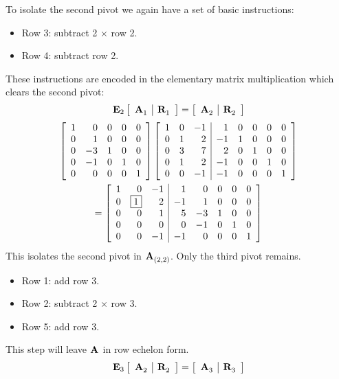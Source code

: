 To isolate the second pivot we again have a set of basic instructions:
\begin{itemize}
\item Row 3: subtract 2 $\times $ row 2.
\item Row 4: subtract row 2.
\end{itemize}
These instructions are encoded in the elementary matrix multiplication which clears the second pivot:
\begin{equation}
  \E{2}\mat{c|c}{\A{}_{1}&\R{}_{1}} = \mat{c|c}{\A{}_{2}&\R{}_{2}}
\end{equation}
\begin{multline}
\mat{ rrrrr }{
 1 &  0 & 0 & 0 & 0 \\
 0 &  1 & 0 & 0 & 0 \\
 0 & -3 & 1 & 0 & 0 \\
 0 & -1 & 0 & 1 & 0 \\
 0 &  0 & 0 & 0 & 1
} 
\left[
\begin{array}{ rrr|rrrrr }
 1 & 0 & -1 &  1 & 0 & 0 & 0 & 0 \\
 0 & 1 &  2 & -1 & 1 & 0 & 0 & 0 \\
 0 & 3 &  7 &  2 & 0 & 1 & 0 & 0 \\
 0 & 1 &  2 & -1 & 0 & 0 & 1 & 0 \\
 0 & 0 & -1 & -1 & 0 & 0 & 0 & 1
\end{array}
\right]\\
 =
\mat{rrr|rrrrr}{
 1 & 0 & -1 &  1 &  0 & 0 & 0 & 0 \\
 0 & \boxed{1} &  2 & -1 & 1 & 0 & 0 & 0 \\
 0 & 0 &  1 &  5 & -3 & 1 & 0 & 0 \\
 0 & 0 &  0 &  0 & -1 & 0 & 1 & 0 \\
 0 & 0 & -1 & -1 &  0 & 0 & 0 & 1
}   
\end{multline} 
This isolates the second pivot in $\A{}_{\paren{2,2}}$. Only the third pivot remains.
\begin{itemize}
\item Row 1: add row 3.
\item Row 2: subtract 2 $\times$ row 3.
\item Row 5: add row 3.
\end{itemize}
This step will leave $\A{}$ in row echelon form.
\begin{equation}
  \E{3} \mat{c|c}{\A{}_{2}&\R{}_{2}} = \mat{c|c}{\A{}_{3}&\R{}_{3}}
\end{equation}
